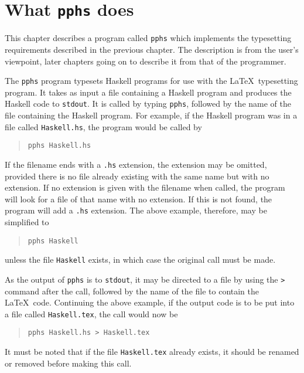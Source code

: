 \chapter{What {\tt pphs} does}

This chapter describes a program called {\tt pphs} which implements the typesetting
requirements described in the previous chapter.  The description is from the user's viewpoint,
later chapters going on to describe it from that of the programmer.

The {\tt pphs} program typesets Haskell programs for use with the \LaTeX\
typesetting program.  It takes as input a file containing a Haskell
program and produces the Haskell code to {\tt stdout}.  It is called by
typing {\tt pphs}, followed by the name of the file containing the Haskell
program.  For example, if the Haskell program was in a file called {\tt Haskell.hs},
the program would be called by
\begin{quote}
\tt pphs Haskell.hs
\end{quote}

If the filename ends with a {\tt .hs} extension, the extension may be omitted, provided
there is no file already existing with the same name but with no extension.  If no
extension is given with the filename when called, the program will look for a file of
that name with no extension. If this is not found, the program will add a {\tt .hs}
extension.  The above example, therefore, may be simplified to
\begin{quote}
\tt pphs Haskell
\end{quote}
unless the file {\tt Haskell} exists, in which case the original call must be made.

As the output of {\tt pphs} is to {\tt stdout}, it may be directed to a file by using
the {\tt >} command after the call, followed by the name of the file to contain
the \LaTeX\ code.  Continuing the above example, if the output code is to be put into
a file called {\tt Haskell.tex}, the call would now be
\begin{quote}
\tt pphs Haskell.hs > Haskell.tex
\end{quote}
It must be noted that if the file {\tt Haskell.tex} already exists, it should be
renamed or removed before making this call.

